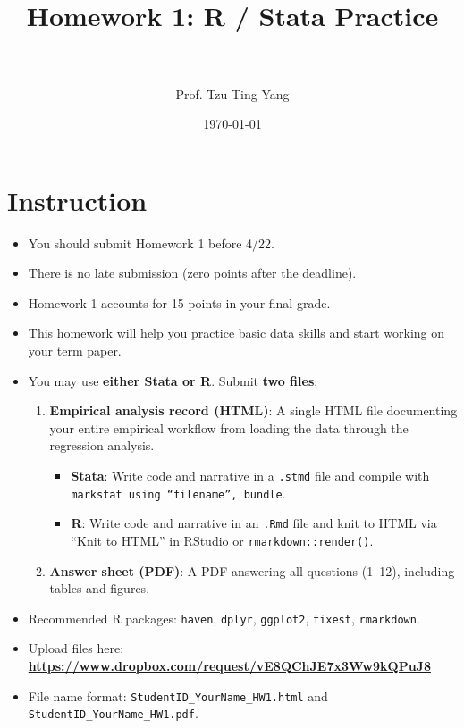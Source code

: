 \documentclass[paper=a4, fontsize=11pt]{scrartcl}
\title{
\normalfont \normalsize
\horrule{0.5pt} \\[0.4cm]
\huge Homework 1: R / Stata Practice \\
\horrule{2pt} \\[0.5cm]
}
\author{Prof. Tzu-Ting Yang}
\date{\normalsize\today}
\begin{document}
\maketitle




\section*{Instruction}

\begin{itemize}
\item[\textbullet] You should submit Homework 1 before 4/22.
\item[\textbullet] There is no late submission (zero points after the deadline).
\item[\textbullet] Homework 1 accounts for 15 points in your final grade.
\item[\textbullet] This homework will help you practice basic data skills and start working on your term paper.
\item[\textbullet] You may use \textbf{either Stata or R}. Submit \textbf{two files}:
  \begin{enumerate}
    \item \textbf{Empirical analysis record (HTML)}: A single HTML file documenting your entire empirical workflow from loading the data through the regression analysis.
    \begin{itemize}
      \item \textbf{Stata}: Write code and narrative in a \texttt{.stmd} file and compile with \texttt{markstat using ``filename'', bundle}.
      \item \textbf{R}: Write code and narrative in an \texttt{.Rmd} file and knit to HTML via ``Knit to HTML'' in RStudio or \texttt{rmarkdown::render()}.
    \end{itemize}
    \item \textbf{Answer sheet (PDF)}: A PDF answering all questions (1--12), including tables and figures.
  \end{enumerate}
\item[\textbullet] Recommended R packages: \texttt{haven}, \texttt{dplyr}, \texttt{ggplot2}, \texttt{fixest}, \texttt{rmarkdown}.
\item[\textbullet] Upload files here: \textbf{\url{https://www.dropbox.com/request/vE8QChJE7x3Ww9kQPuJ8}}
\item[\textbullet] File name format: \texttt{StudentID\_YourName\_HW1.html} and \texttt{StudentID\_YourName\_HW1.pdf}.
\end{itemize}
\end{document}
